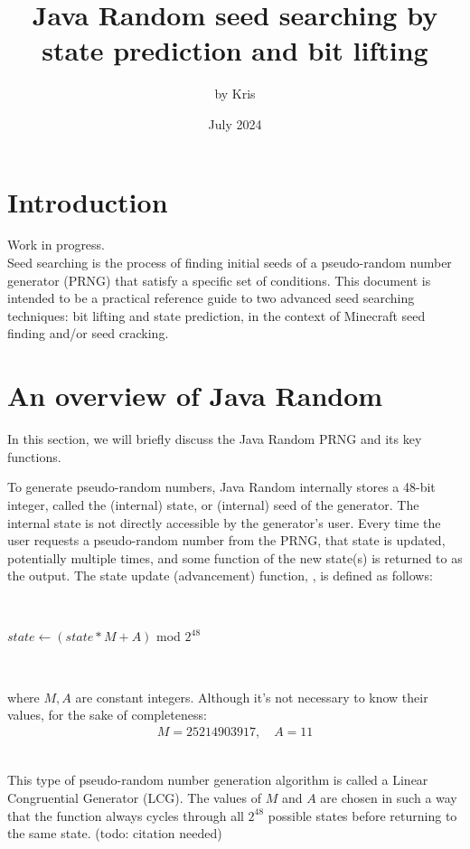 \documentclass{article}
\title{Java Random seed searching by state prediction and bit lifting}
\author{by Kris}
\date{July 2024}
\begin{document}
\maketitle

\section{Introduction}
Work in progress.\\
Seed searching is the process of finding initial seeds of a pseudo-random number generator (PRNG) that satisfy a specific set of conditions.
This document is intended to be a practical reference guide to two advanced seed searching techniques: bit lifting and state prediction, in the context of Minecraft seed finding and/or seed cracking.

\section{An overview of Java Random}
In this section, we will briefly discuss the Java Random PRNG and its key functions.

To generate pseudo-random numbers, Java Random internally stores a 48-bit integer, called the (internal) state, or (internal) seed of the generator. The internal state is not directly accessible by the generator’s user. Every time the user requests a pseudo-random number from the PRNG, that state is updated, potentially multiple times, and some function of the new state(s) is returned to as the output. The state update (advancement) function, , is defined as follows:

\
\begin{algorithmic}
    \State $state \gets (state * M + A)$ mod $2^{48}$
\EndFunction
\end{algorithmic}
\ \

\noindent where $M, A$ are constant integers. Although it's not necessary to know their values, for the sake of completeness:
\begin{align*}
    M = 25214903917, \quad A = 11
\end{align*}
\ \

This type of pseudo-random number generation algorithm is called a Linear Congruential Generator (LCG). The values of $M$ and $A$ are chosen in such a way that the  function always cycles through all $2^{48}$ possible states before returning to the same state. (todo: citation needed)
\end{document}
